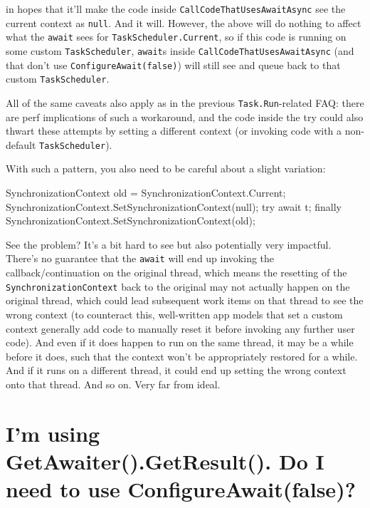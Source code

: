 \documentclass[a4paper,12pt,notitlepage,twoside,openright]{article}
\begin{document}
in hopes that it'll make the code inside
\texttt{CallCodeThatUsesAwaitAsync} see the current context as
\texttt{null}. And it will. However, the above will do nothing to affect
what the \texttt{await} sees for \texttt{TaskScheduler.Current}, so if
this code is running on some custom \texttt{TaskScheduler},
\texttt{await}s inside \texttt{CallCodeThatUsesAwaitAsync} (and that
don't use \texttt{ConfigureAwait(false)}) will still see and queue back
to that custom \texttt{TaskScheduler}.

All of the same caveats also apply as in the previous
\texttt{Task.Run}-related FAQ: there are perf implications of such a
workaround, and the code inside the try could also thwart these attempts
by setting a different context (or invoking code with a non-default
\texttt{TaskScheduler}).

With such a pattern, you also need to be careful about a slight
variation:

\begin{csharpcode}
SynchronizationContext old = SynchronizationContext.Current;
SynchronizationContext.SetSynchronizationContext(null);
try
{
    await t;
}
finally { SynchronizationContext.SetSynchronizationContext(old); }
\end{csharpcode}

See the problem? It's a bit hard to see but also potentially very
impactful. There's no guarantee that the \texttt{await} will end up
invoking the callback/continuation on the original thread, which means
the resetting of the \texttt{SynchronizationContext} back to the
original may not actually happen on the original thread, which could
lead subsequent work items on that thread to see the wrong context (to
counteract this, well-written app models that set a custom context
generally add code to manually reset it before invoking any further user
code). And even if it does happen to run on the same thread, it may be a
while before it does, such that the context won't be appropriately
restored for a while. And if it runs on a different thread, it could end
up setting the wrong context onto that thread. And so on. Very far from
ideal.

\hypertarget{im-using-getawaiter.getresult.-do-i-need-to-use-configureawaitfalse}{%
\section{I'm using GetAwaiter().GetResult(). Do I need to use
ConfigureAwait(false)?}\label{im-using-getawaiter.getresult.-do-i-need-to-use-configureawaitfalse}}
\end{document}
